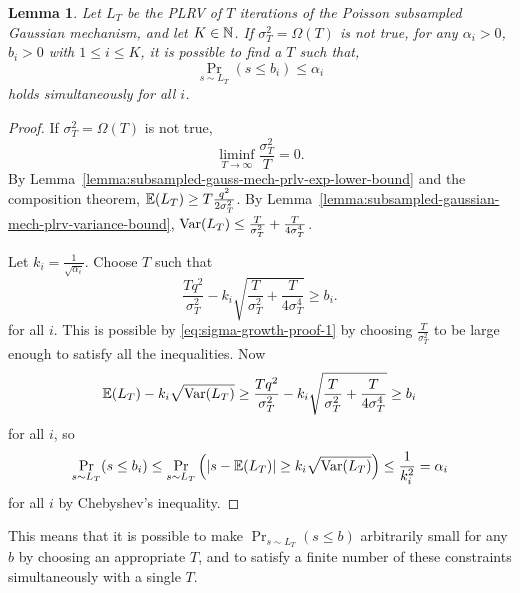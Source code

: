 \documentclass{article}
\theoremstyle{plain}
\newtheorem{lemma}[theorem]{Lemma}
\theoremstyle{definition}
\theoremstyle{remark}
\begin{document}
\begin{lemma}\label{lemma:subsampled-gaussian-mech-plrv-tail-bound}
    Let $L_T$ be the PLRV of $T$ iterations of the Poisson subsampled Gaussian mechanism,
    and let $K \in \mathbb{N}$. If $\sigma_T^2 = \Omega(T)$ is not true, for any $\alpha_i > 0$, $b_i > 0$ with $1 \leq i \leq K$,
    it is possible to find a $T$ such that,
    \begin{equation}
        \Pr_{s\sim L_T}(s \leq b_i) \leq \alpha_i
    \end{equation}
    holds simultaneously for all $i$.
\end{lemma}
\begin{proof}
    If $\sigma_T^2 = \Omega(T)$ is not true, 
    \begin{equation}
        \liminf_{T\to \infty} \frac{\sigma_T^2}{T} = 0.\label{eq:sigma-growth-proof-1}
    \end{equation}
    By Lemma~\ref{lemma:subsampled-gauss-mech-prlv-exp-lower-bound} and the composition theorem,
    $\operatorname{\mathbb{E}}(L_T) \geq T\frac{q^2}{2\sigma_T^2}$. 
    By Lemma~\ref{lemma:subsampled-gaussian-mech-plrv-variance-bound}, 
    $\operatorname{Var}(L_T) \leq \frac{T}{\sigma_T^2} + \frac{T}{4\sigma_T^4}$.
    
    Let $k_i = \frac{1}{\sqrt{\alpha_i}}$. Choose $T$ such that 
    \begin{equation}
        \frac{Tq^2}{\sigma_T^2} - k_i\sqrt{\frac{T}{\sigma_T^2} + \frac{T}{4\sigma_T^4}} \geq b_i.
    \end{equation}
    for all $i$.
    This is possible by \eqref{eq:sigma-growth-proof-1} by choosing $\frac{T}{\sigma_T^2}$ to be large enough to 
    satisfy all the inequalities.
    Now
    \begin{equation}
        \operatorname{\mathbb{E}}(L_T) - k_i\sqrt{\operatorname{Var}(L_T)} 
        \geq \frac{Tq^2}{\sigma_T^2} - k_i\sqrt{\frac{T}{\sigma_T^2} + \frac{T}{4\sigma_T^4}} 
        \geq b_i
    \end{equation}
    for all $i$, so
    \begin{equation}
        \Pr_{s\sim L_T}(s \leq b_i)
        \leq \Pr_{s\sim L_T}\left(|s - \operatorname{\mathbb{E}}(L_T)| \geq k_i\sqrt{\operatorname{Var}(L_T)}\right)
        \leq \frac{1}{k_i^2}
        = \alpha_i
    \end{equation}
    for all $i$ by Chebyshev's inequality. 
\end{proof}
This means that it is possible to make $\Pr_{s\sim L_T}(s \leq b)$ arbitrarily small
for any $b$ by choosing an appropriate $T$, and to satisfy a finite number of these 
constraints simultaneously with a single $T$.
\end{document}
